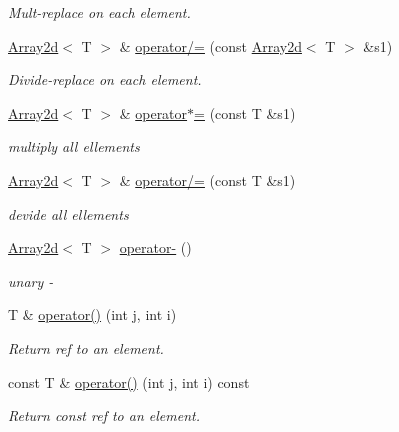 \begin{DoxyCompactItemize}
\begin{DoxyCompactList}\small\item\em Mult-\/replace on each element. \end{DoxyCompactList}\item 
\mbox{\hyperlink{classXMLArray_1_1Array2d}{Array2d}}$<$ T $>$ \& \mbox{\hyperlink{classXMLArray_1_1Array2d_a704df3d7442ab68977e0caa8f8f059cd}{operator/=}} (const \mbox{\hyperlink{classXMLArray_1_1Array2d}{Array2d}}$<$ T $>$ \&s1)
\begin{DoxyCompactList}\small\item\em Divide-\/replace on each element. \end{DoxyCompactList}\item 
\mbox{\hyperlink{classXMLArray_1_1Array2d}{Array2d}}$<$ T $>$ \& \mbox{\hyperlink{classXMLArray_1_1Array2d_aee0e6a53c2f9dcc263ba59286d359b38}{operator$\ast$=}} (const T \&s1)
\begin{DoxyCompactList}\small\item\em multiply all ellements \end{DoxyCompactList}\item 
\mbox{\hyperlink{classXMLArray_1_1Array2d}{Array2d}}$<$ T $>$ \& \mbox{\hyperlink{classXMLArray_1_1Array2d_aa699e2de82efb77e8e5e875a63eb7d8b}{operator/=}} (const T \&s1)
\begin{DoxyCompactList}\small\item\em devide all ellements \end{DoxyCompactList}\item 
\mbox{\hyperlink{classXMLArray_1_1Array2d}{Array2d}}$<$ T $>$ \mbox{\hyperlink{classXMLArray_1_1Array2d_a650034573254ebdd7c914d68a498e2c9}{operator-\/}} ()
\begin{DoxyCompactList}\small\item\em unary -\/ \end{DoxyCompactList}\item 
T \& \mbox{\hyperlink{classXMLArray_1_1Array2d_ab8618dbef1cc6b94b3345ce3da0ad996}{operator()}} (int j, int i)
\begin{DoxyCompactList}\small\item\em Return ref to an element. \end{DoxyCompactList}\item 
const T \& \mbox{\hyperlink{classXMLArray_1_1Array2d_aa02dc8ee58bd33aca0cfbbf58cbf1ba7}{operator()}} (int j, int i) const
\begin{DoxyCompactList}\small\item\em Return const ref to an element. \end{DoxyCompactList}\item 

\end{DoxyCompactItemize}
